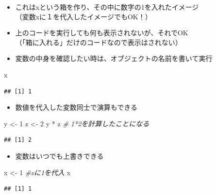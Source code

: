 \documentclass[
]{book}
\newenvironment{Shaded}{\begin{snugshade}}{\end{snugshade}}
\newcommand{\CommentTok}[1]{\textcolor[rgb]{0.56,0.35,0.01}{\textit{#1}}}
\newcommand{\DecValTok}[1]{\textcolor[rgb]{0.00,0.00,0.81}{#1}}
\newcommand{\NormalTok}[1]{#1}
\newcommand{\OtherTok}[1]{\textcolor[rgb]{0.56,0.35,0.01}{#1}}
\newcommand{\SpecialCharTok}[1]{\textcolor[rgb]{0.00,0.00,0.00}{#1}}
\providecommand{\tightlist}{%
  \setlength{\itemsep}{0pt}\setlength{\parskip}{0pt}}
\begin{document}
\begin{itemize}
\tightlist
\item
  これはxという箱を作り、その中に数字の1を入れたイメージ\\
  （変数xに１を代入したイメージでもOK！）
\item
  上のコードを実行しても何も表示されないが、それでOK\\
  （「箱に入れる」だけのコードなので表示はされない）
\item
  変数の中身を確認したい時は、オブジェクトの名前を書いて実行
\end{itemize}

\begin{Shaded}
\begin{Highlighting}[]
\NormalTok{x}
\end{Highlighting}
\end{Shaded}

\begin{verbatim}
## [1] 1
\end{verbatim}

\begin{itemize}
\tightlist
\item
  数値を代入した変数同士で演算もできる
\end{itemize}

\begin{Shaded}
\begin{Highlighting}[]
\NormalTok{y }\OtherTok{\textless{}{-}} \DecValTok{1} 
\NormalTok{z }\OtherTok{\textless{}{-}} \DecValTok{2}
\NormalTok{y }\SpecialCharTok{*}\NormalTok{ z }\CommentTok{\# 1*2を計算したことになる}
\end{Highlighting}
\end{Shaded}

\begin{verbatim}
## [1] 2
\end{verbatim}

\begin{itemize}
\tightlist
\item
  変数はいつでも上書きできる
\end{itemize}

\begin{Shaded}
\begin{Highlighting}[]
\NormalTok{x }\OtherTok{\textless{}{-}} \DecValTok{1} \CommentTok{\#xに1を代入}
\NormalTok{x}
\end{Highlighting}
\end{Shaded}

\begin{verbatim}
## [1] 1
\end{verbatim}
\end{document}
